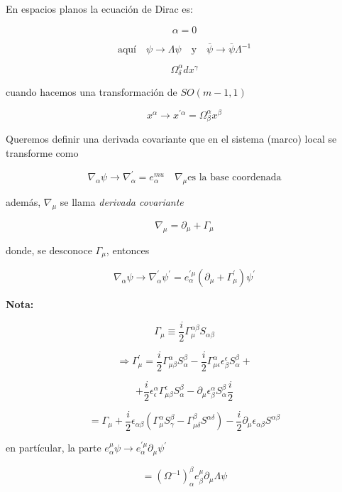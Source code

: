 \documentclass{report}
\begin{document}
{En espacios planos la ecuación de Dirac es:

\begin{equation}
[i\gamma^{\alpha}(\partial _{\alpha} - m)] \alpha = 0
\end{equation}

\[\text{aquí} \quad \psi \rightarrow \Lambda \psi \quad \text{y} \quad \overline{\psi} \rightarrow \overline{\psi} \Lambda^{-1}\]

\[\Omega_{\delta}^{\alpha}dx^{\gamma}\]

cuando hacemos una transformación de $SO(m-1,1)$

\[x^{\alpha} \rightarrow x^{\prime \alpha}= \Omega_{\beta}^{\alpha}x^{\beta}\]

Queremos definir una derivada covariante que en el sistema (marco) local se transforme como 

\[\nabla_{\alpha} \psi \rightarrow \nabla_{\alpha}^{\prime} = e_{\alpha}^{mu} \quad \nabla_{\mu} \text{es la base coordenada} \]

además, $\nabla_{\mu}$ se llama \textit{derivada covariante}

\[\nabla_{\mu} = \partial_{\mu} + \Gamma_{\mu}\]

donde, se desconoce $\Gamma_{\mu }$, entonces

\[\nabla _{\alpha} \psi \rightarrow \nabla _{\alpha}^{\prime} \psi^{\prime} = e_{\alpha}^{\prime \mu} (\partial_{\mu} + \Gamma_{\mu}^{\prime})\psi^{\prime}\]

\textbf{Nota: }

\[\Gamma_{\mu} \equiv \frac{i}{2} \Gamma_{\mu}^{\alpha \beta} S_{\alpha \beta}\]

\[\Rightarrow \Gamma_{\mu}^{\prime} = \frac{i}{2} \Gamma_{\mu \beta}^{\alpha} S_{\alpha}^{\beta} - \frac{i}{2} \Gamma_{\mu \epsilon}^{\alpha} \epsilon_{\beta}^{\epsilon} S_{\alpha}^{\beta}+\]

\[+ \frac{i}{2} \epsilon_{\epsilon}^{\alpha} \Gamma_{\mu \beta}^{\epsilon} S_{\alpha}^{\beta} - \partial_{\mu} \epsilon_{\beta}^{\alpha} S_{\alpha}^{\beta} \frac{i}{2}\]

\[= \Gamma_{\mu} + \frac{i}{2} \epsilon_{\alpha \beta} (\Gamma_{\mu}^{\alpha} S_{\gamma}^{\beta} - \Gamma_{\mu \delta}^{\beta}S^{\alpha \delta}) - \frac{i}{2} \partial_{\mu} \epsilon_{\alpha \beta} S^{\alpha \beta}\]

en partícular, la parte $e_{\alpha}^{\mu} \psi \rightarrow e_{\alpha}^{\prime \mu}\partial_{\mu} \psi^{\prime} $

\[= (\Omega^{-1})_{\alpha}^{\beta}e_{\beta}^{\mu} \partial_{\mu} \Lambda \psi\]

}
\end{document}
